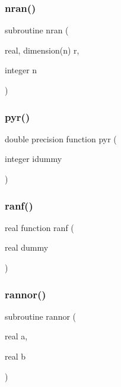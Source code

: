 \mbox{\label{gmc__random_8f_a7b1dcdac0dcede17363f3378f1d37760}} 
\subsubsection{\texorpdfstring{nran()}{nran()}}
{\footnotesize\ttfamily subroutine nran (\begin{DoxyParamCaption}\item[{real, dimension(n)}]{r,  }\item[{integer}]{n }\end{DoxyParamCaption})}

\mbox{\label{gmc__random_8f_adc1905efb1ff6d967d69f6823feb5e92}} 
\subsubsection{\texorpdfstring{pyr()}{pyr()}}
{\footnotesize\ttfamily double precision function pyr (\begin{DoxyParamCaption}\item[{integer}]{idummy }\end{DoxyParamCaption})}

\mbox{\label{gmc__random_8f_a1b59c2860c681ba2938e38284ff3ae3d}} 
\subsubsection{\texorpdfstring{ranf()}{ranf()}}
{\footnotesize\ttfamily real function ranf (\begin{DoxyParamCaption}\item[{real}]{dummy }\end{DoxyParamCaption})}

\mbox{\label{gmc__random_8f_a3da8efd8c2842ba8d47569f6bec2e989}} 
\subsubsection{\texorpdfstring{rannor()}{rannor()}}
{\footnotesize\ttfamily subroutine rannor (\begin{DoxyParamCaption}\item[{real}]{a,  }\item[{real}]{b }\end{DoxyParamCaption})}

